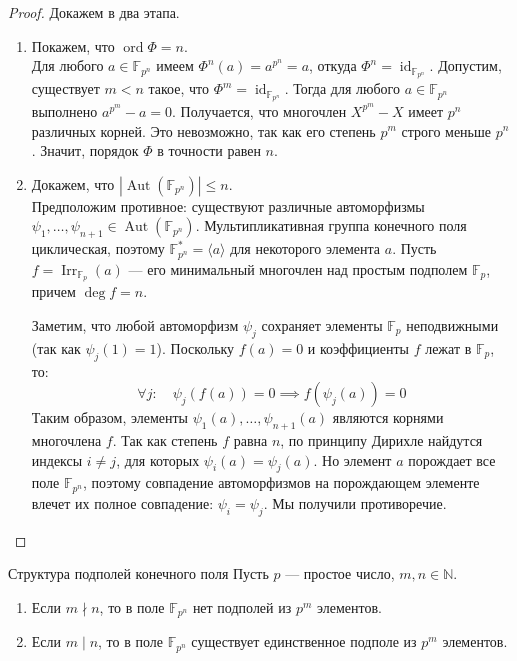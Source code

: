 \begin{proof}
	Докажем в два этапа.
	\begin{enumerate}
		\item Покажем, что $\operatorname{ord} \Phi = n$. \\
		Для любого $a \in \mathbb{F}_{p^n}$ имеем $\Phi^n(a) = a^{p^n} = a$, откуда $\Phi^n = \operatorname{id}_{\mathbb{F}_{p^n}}$. 
		Допустим, существует $m < n$ такое, что $\Phi^m = \operatorname{id}_{\mathbb{F}_{p^n}}$. Тогда для любого $a \in \mathbb{F}_{p^n}$ выполнено $a^{p^m} - a = 0$. Получается, что многочлен $X^{p^m} - X$ имеет $p^n$ различных корней. Это невозможно, так как его степень $p^m$ строго меньше $p^n$. Значит, порядок $\Phi$ в точности равен $n$.
		
		\item Докажем, что $|\operatorname{Aut}(\mathbb{F}_{p^n})| \le n$. \\
		Предположим противное: существуют различные автоморфизмы $\psi_1, \dots, \psi_{n+1} \in \operatorname{Aut}(\mathbb{F}_{p^n})$.
		Мультипликативная группа конечного поля циклическая, поэтому $\mathbb{F}_{p^n}^* = \langle a \rangle$ для некоторого элемента $a$. Пусть $f = \operatorname{Irr}_{\mathbb{F}_p}(a)$ --- его минимальный многочлен над простым подполем $\mathbb{F}_p$, причем $\deg f = n$.
		
		Заметим, что любой автоморфизм $\psi_j$ сохраняет элементы $\mathbb{F}_p$ неподвижными (так как $\psi_j(1)=1$). Поскольку $f(a) = 0$ и коэффициенты $f$ лежат в $\mathbb{F}_p$, то:
		\[ \forall j : \quad \psi_j(f(a)) = 0 \implies f(\psi_j(a)) = 0 \]
		Таким образом, элементы $\psi_1(a), \dots, \psi_{n+1}(a)$ являются корнями многочлена $f$. Так как степень $f$ равна $n$, по принципу Дирихле найдутся индексы $i \neq j$, для которых $\psi_i(a) = \psi_j(a)$. 
		Но элемент $a$ порождает все поле $\mathbb{F}_{p^n}$, поэтому совпадение автоморфизмов на порождающем элементе влечет их полное совпадение: $\psi_i = \psi_j$. Мы получили противоречие.
	\end{enumerate}
\end{proof}

\begin{Theorem}{Структура подполей конечного поля}{}
	Пусть $p$ --- простое число, $m, n \in \mathbb{N}$.
	\begin{enumerate}
		\item Если $m \nmid n$, то в поле $\mathbb{F}_{p^n}$ нет подполей из $p^m$ элементов.
		\item Если $m \mid n$, то в поле $\mathbb{F}_{p^n}$ существует единственное подполе из $p^m$ элементов.
	\end{enumerate}
\end{Theorem}


